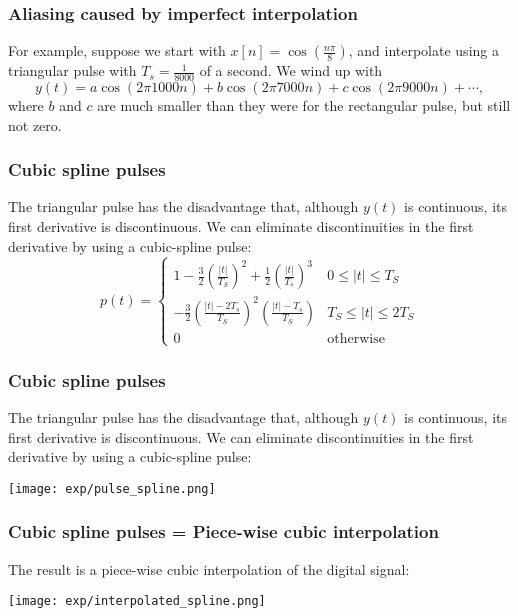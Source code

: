 \documentclass{beamer}
\begin{document}
\begin{frame}
  \frametitle{Aliasing caused by imperfect interpolation}

  For example, suppose we start with
  $x[n]=\cos\left(\frac{n\pi}{8}\right)$, and interpolate using a
  triangular pulse with $T_s=\frac{1}{8000}$ of a second.  We wind up
  with
  \begin{displaymath}
    y(t) = a\cos\left(2\pi 1000 n\right)+b\cos\left(2\pi 7000n\right)+c\cos\left(2\pi 9000 n\right)+\cdots,
  \end{displaymath}
  where $b$ and $c$ are much smaller than they were for the rectangular pulse, but
  still not zero. 
\end{frame}

\begin{frame}
  \frametitle{Cubic spline pulses}

  The triangular pulse has the disadvantage that, although $y(t)$ is continuous, its
  first derivative is discontinuous.  We can eliminate discontinuities in the first derivative
  by using a cubic-spline pulse:
  \begin{displaymath}
    p(t) = \begin{cases}
      1-\frac{3}{2}\left(\frac{|t|}{T_S}\right)^2 +\frac{1}{2}\left(\frac{|t|}{T_s}\right)^3 & 0\le |t|\le T_S\\
      -\frac{3}{2}\left(\frac{|t|-2T_s}{T_S}\right)^2\left(\frac{|t|-T_s}{T_S}\right) & T_S\le |t|\le 2T_S\\
      0 & \mbox{otherwise}
    \end{cases}
  \end{displaymath}

\end{frame}

\begin{frame}
  \frametitle{Cubic spline pulses}

  The triangular pulse has the disadvantage that, although $y(t)$ is continuous, its
  first derivative is discontinuous.  We can eliminate discontinuities in the first derivative
  by using a cubic-spline pulse:
  \centerline{\texttt{[image: exp/pulse\_spline.png]}}  
\end{frame}

\begin{frame}
  \frametitle{Cubic spline pulses = Piece-wise cubic interpolation}

  The result is a  piece-wise cubic interpolation of the digital signal:

  \centerline{\texttt{[image: exp/interpolated\_spline.png]}}  
\end{frame}
\end{document}
